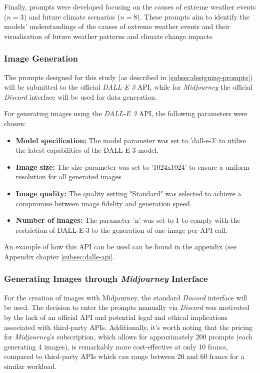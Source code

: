 Finally, prompts were developed focusing on the causes of extreme weather events ($n=3$) and future climate scenarios ($n=8$). These prompts aim to identify the models' understandings of the causes of extreme weather events and their visualisation of future weather patterns and climate change impacts.

\subsubsection{Image Generation}
The prompts designed for this study (as described in \ref{subsec:designing-prompts}) will be submitted to the official \textit{DALL-E 3} API, while for  \textit{Midjourney} the official \textit{Discord} interface will be used for data generation.

\noindent
For generating images using the \textit{DALL-E 3} API, the following parameters were chosen:

\begin{itemize}
\item \textbf{Model specification:} The model parameter was set to 'dall-e-3' to utilise the latest capabilities of the DALL-E 3 model.
\item \textbf{Image size:} The size parameter was set to '1024x1024' to ensure a uniform resolution for all generated images.
\item \textbf{Image quality:} The quality setting "Standard" was selected to achieve a compromise between image fidelity and generation speed.
\item \textbf{Number of images:} The parameter 'n' was set to 1 to comply with the restriction of DALL-E 3 to the generation of one image per API call.
\end{itemize}

An example of how this API can be used can be found in the appendix (see Appendix chapter \ref{subsec:dalle-api}.

\subsubsection{Generating Images through  \textit{Midjourney} Interface}

For the creation of images with Midjourney, the standard \textit{Discord} interface will be used. The decision to enter the prompts manually via \textit{Discord} was motivated by the lack of an official API and potential legal and ethical implications associated with third-party APIs. Additionally, it's worth noting that the pricing for \textit{Midjourney}'s subscription, which allows for approximately 200 prompts (each generating 4 images), is remarkably more cost-effective at only 10 francs, compared to third-party APIs which can range between 20 and 60 francs for a similar workload.

